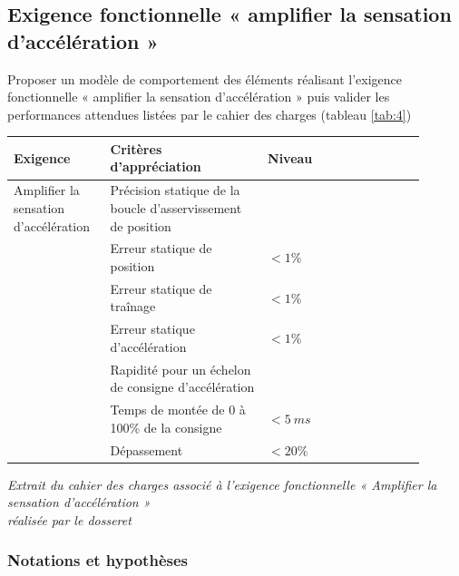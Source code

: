 \documentclass[10pt,fleqn]{article} %
\begin{document}
\begin{multicols}{2}
\subsection*{Exigence fonctionnelle « amplifier la sensation
d'accélération »}

\begin{obj}
Proposer un modèle de comportement des éléments réalisant l'exigence
fonctionnelle « amplifier la sensation d'accélération » puis valider les
performances attendues listées par le cahier des charges (tableau \ref{tab:4})
\end{obj}


 \begin{center}
    \begin{tabular}{|p{0.2\linewidth}|p{0.35\linewidth}|p{0.35\linewidth}|}
    \hline
    \textbf{Exigence} & \textbf{Critères d'appréciation} & \textbf{Niveau} \\
    \hline
    Amplifier la sensation d'accélération & Précision statique de la boucle d'asservissement de position & \multicolumn{1}{r|}{} \\
          & Erreur statique de position  &$<1\%$\\
          & Erreur statique de traînage  & $<1\%$ \\
          & Erreur statique d'accélération & $<1\%$ \\
\cline{2-3}          & Rapidité pour un échelon de consigne d'accélération &  \\
          & Temps de montée de 0 à 100\% de la consigne  & $<\SI{5}{ms}$ \\
          & Dépassement & $<20\%$ \\
\hline
    \end{tabular}%
    
\textit{Extrait du cahier des charges associé à l'exigence fonctionnelle « Amplifier la sensation d'accélération » \\  réalisée par le dosseret \label{tab:4}}%
 \end{center}

\subsubsection{Notations et hypothèses}


\end{multicols}
\end{document}
